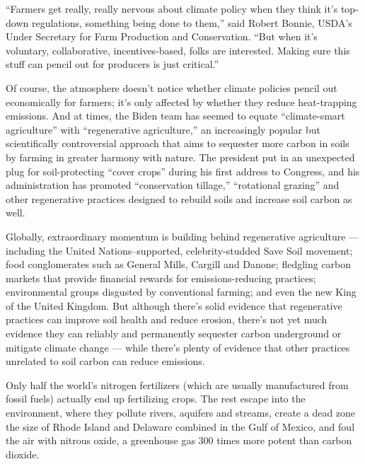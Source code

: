\documentclass[
]{book}
\begin{document}
``Farmers get really, really nervous about climate policy when they think it's top-down regulations, something being done to them,'' said Robert Bonnie, USDA's Under Secretary for Farm Production and Conservation. \hspace{0pt}``But when it's voluntary, collaborative, incentives-based, folks are interested. Making sure this stuff can pencil out for producers is just critical.''

Of course, the atmosphere doesn't notice whether climate policies pencil out economically for farmers; it's only affected by whether they reduce heat-trapping emissions. And at times, the Biden team has seemed to equate \hspace{0pt}``climate-smart agriculture'' with \hspace{0pt}``regenerative agriculture,'' an increasingly popular but scientifically controversial approach that aims to sequester more carbon in soils by farming in greater harmony with nature. The president put in an unexpected plug for soil-protecting \hspace{0pt}``cover crops'' during his first address to Congress, and his administration has promoted \hspace{0pt}``conservation tillage,'' \hspace{0pt}``rotational grazing'' and other regenerative practices designed to rebuild soils and increase soil carbon as well.

Globally, extraordinary momentum is building behind regenerative agriculture --- including the United Nations--supported, celebrity-studded Save Soil movement; food conglomerates such as General Mills, Cargill and Danone; fledgling carbon markets that provide financial rewards for emissions-reducing practices; environmental groups disgusted by conventional farming; and even the new King of the United Kingdom. But although there's solid evidence that regenerative practices can improve soil health and reduce erosion, there's not yet much evidence they can reliably and permanently sequester carbon underground or mitigate climate change --- while there's plenty of evidence that other practices unrelated to soil carbon can reduce emissions.

Only half the world's nitrogen fertilizers (which are usually manufactured from fossil fuels) actually end up fertilizing crops. The rest escape into the environment, where they pollute rivers, aquifers and streams, create a dead zone the size of Rhode Island and Delaware combined in the Gulf of Mexico, and foul the air with nitrous oxide, a greenhouse gas 300 times more potent than carbon dioxide.
\end{document}
